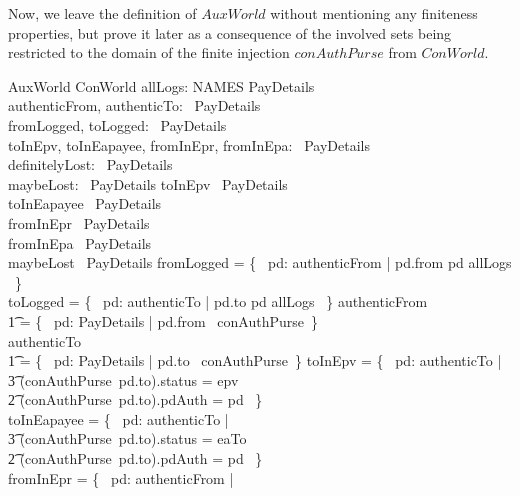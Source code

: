 Now, we leave the definition of $AuxWorld$ without mentioning
any finiteness properties, but prove it later as a consequence of
the involved sets being restricted to the domain of the finite injection $conAuthPurse$
from $ConWorld$.
%
\begin{LSDef}
\begin{schema}{AuxWorld}
   ConWorld
   \also
   allLogs: NAMES \rel PayDetails \\
   authenticFrom, authenticTo: \power~PayDetails \\
   fromLogged, toLogged: \power~PayDetails \\
   toInEpv, toInEapayee, fromInEpr, fromInEpa: \power~PayDetails \\
   definitelyLost: \power~PayDetails \\
   maybeLost: \power~PayDetails
\where
   toInEpv \in \finset~PayDetails \\
   toInEapayee \in \finset~PayDetails \\
   fromInEpr \in \finset~PayDetails \\
   fromInEpa \in \finset~PayDetails \\
   maybeLost \in \finset~PayDetails
   \also
   fromLogged = \{~ pd: authenticFrom | pd.from \mapsto pd \in allLogs ~\} \\
   toLogged = \{~ pd: authenticTo | pd.to \mapsto pd \in allLogs ~\}
   \also
   authenticFrom \\
      \t1 = \{~ pd: PayDetails | pd.from \in \dom~conAuthPurse~\} \\
   authenticTo \\
      \t1 = \{~ pd: PayDetails | pd.to \in \dom~conAuthPurse~\}
   \also
   toInEpv = \{~ pd: authenticTo | \\
          \t3 (conAuthPurse~pd.to).status = epv \\
          \t2 \land (conAuthPurse~pd.to).pdAuth = pd ~\} \\
   toInEapayee = \{~ pd: authenticTo | \\
          \t3 (conAuthPurse~pd.to).status = eaTo \\
          \t2 \land (conAuthPurse~pd.to).pdAuth = pd ~\} \\
   fromInEpr = \{~ pd: authenticFrom | \\

\end{schema}
\end{LSDef}
